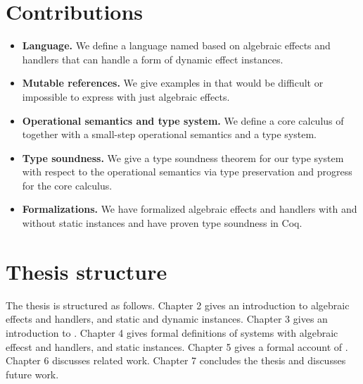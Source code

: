 \section*{Contributions}
\begin{itemize}

\item \textbf{Language.}
We define a language named \lang{} based on algebraic effects and handlers that can handle a form of dynamic effect instances.

\item \textbf{Mutable references.}
We give examples in \lang{} that would be difficult or impossible to express with just algebraic effects.

\item \textbf{Operational semantics and type system.}
We define a core calculus of \lang{} together with a small-step operational semantics and a type system.

\item \textbf{Type soundness.}
We give a type soundness theorem for our type system with respect to the operational semantics via type preservation and progress for the core calculus.

\item \textbf{Formalizations.}
We have formalized algebraic effects and handlers with and without static instances and have proven type soundness in Coq.

\end{itemize}

\section*{Thesis structure}
The thesis is structured as follows.
Chapter 2 gives an introduction to algebraic effects and handlers, and static and dynamic instances.
Chapter 3 gives an introduction to \lang{}.
Chapter 4 gives formal definitions of systems with algebraic effecst and handlers, and static instances.
Chapter 5 gives a formal account of \lang{}.
Chapter 6 discusses related work.
Chapter 7 concludes the thesis and discusses future work.
